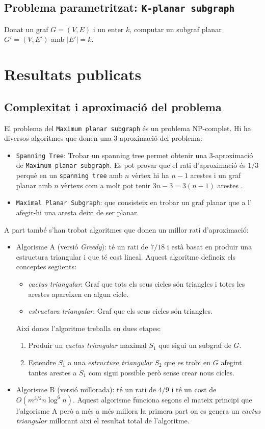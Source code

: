 \documentclass[a4paper]{article}
\begin{document}
\subsection{Problema parametritzat: \texttt{K-planar subgraph}}
Donat un graf $G=(V,E)$ i un enter $k$, computar un subgraf planar $G'=(V,E')$ amb $|E'|=k$.

\section{Resultats publicats}

\subsection{Complexitat i aproximació del problema}
El problema del \texttt{Maximum planar subgraph} és un problema NP-complet. Hi ha diversos algoritmes que donen una 3-aproximació del problema\cite{betterApproximation}:
\begin{itemize}
	\item \texttt{Spanning Tree}: Trobar un spanning tree permet obtenir una 3-aproximació de \texttt{Maximum planar subgraph}. Es pot provar que el rati d'aproximació és $1/3$ perquè en un \texttt{spanning tree} amb $n$ vèrtex hi ha $n - 1$ arestes i un graf planar amb $n$ vèrtexs com a molt pot tenir $3n - 3 = 3(n - 1)$ arestes \cite{planar}.
	\item \texttt{Maximal Planar Subgraph}: que consisteix en trobar un graf planar que a l' afegir-hi una aresta deixi de ser planar.	
\end{itemize}

A part també s'han trobat algoritmes que donen un millor rati d'aproximació:
\begin{itemize}
	\item Algorisme A (versió \emph{Greedy}): té un rati de $7/18$ i està basat en produir una estructura triangular i que té cost lineal. Aquest algoritme defineix els conceptes següents:
	\begin{itemize}
		\item \emph{cactus triangular}: Graf que tots els seus cicles són triangles i totes les arestes apareixen en algun cicle.
		\item \emph{estructura triangular}: Graf que els seus cicles són triangles.
	\end{itemize}
	Així doncs l'algoritme treballa en dues etapes:
	\begin{enumerate}
		\item Produir un \emph{cactus triangular} maximal $S_1$ que sigui un subgraf de $G$.
		\item Estendre $S_1$ a una \emph{estructura triangular} $S_2$ que es trobi en $G$ afegint tantes arestes a $S_1$ com sigui possible però sense crear nous cicles.
	\end{enumerate}
	\item Algorisme B (versió millorada): té un rati de $4/9$ i té un cost de $O(m^{3/2}n\log^6 n)$. Aquest algorisme funciona segons el mateix principi que l'algorisme A però a més a més millora la primera part on es genera un \emph{cactus triangular} millorant així el resultat total de l'algoritme. 
\end{itemize}

\printbibliography
\end{document}
